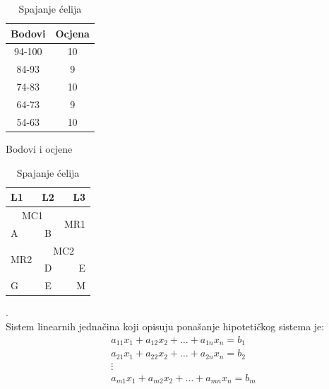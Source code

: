 \documentclass{article}
\begin{document}
\begin{table}[!htb]
\begin{minipage}[b]{0.5\textwidth}
\center
\begin{tabular}{c c}
\hline \hline
{Bodovi} & Ocjena\\ \hline
{94-100} & 10\\
{84-93}  & 9\\
{74-83}  & 10\\
{64-73}  & 9\\
{54-63}  & 10\\ \hline\hline
\end{tabular}
\caption{Bodovi i ocjene}
\end{minipage}
\begin{minipage}[b]{0.5\textwidth}
\centering
\begin{tabular}{|l|c|r|}
\hline \hline 
\cellcolor{mycolor2}L1 & L2 & L3\\ \hline
\multicolumn{2}{|c|}{\cellcolor{mycolor3}MC1} & \multirow{2}{*}{MR1}\\ \cline{1-2}
A & B & \\ \hline
\multirow{2}{*}{MR2} & \multicolumn{2}{c}{MC2} \vline \\
\cline{2-2} & D & \cellcolor{mycolor4}E\\ \hline
G & \cellcolor{pink}E & M\\
\hline\hline
\end{tabular}
\caption{Spajanje ćelija}
\end{minipage}
\end{table}
\vspace{-2mm}
\begin{center}
\begin{minipage}{121mm}
\end{minipage}
\end{center}
.\\
Sistem linearnih jednačina koji opisuju ponašanje hipotetičkog sistema je: 
\begin{align}
    a_{11}x_{1} + a_{12}x_{2} + \dots + a_{1n}x_{n} = b_{1} \\ \nonumber
    a_{21}x_{1} + a_{22}x_{2} + \dots + a_{2n}x_{n} = b_{2} \\ \nonumber
    \vdots  \\ \nonumber
    a_{m1}x_{1} + a_{m2}x_{2} + \dots + a_{mn}x_{n} = b_{m} \nonumber
\end{align}
\end{document}

